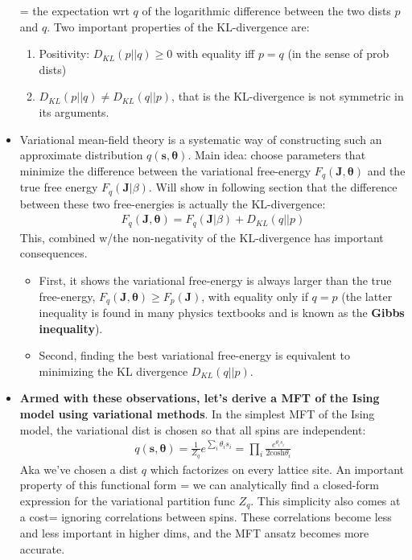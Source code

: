 \documentclass[norsk,a4paper,11pt]{article}
\begin{document}
\begin{itemize}
	= the expectation wrt $q$ of the logarithmic difference between the two dists $p$ and $q$. Two important properties of the KL-divergence are:
	\begin{enumerate}
		\item Positivity: $D_{KL}(p||q) \geq 0 $ with equality iff $p=q$ (in the sense of prob dists)
		\item $D_{KL}(p||q) \neq D_{KL}(q||p)$, that is the KL-divergence is not symmetric in its arguments.
	\end{enumerate}
	\item Variational mean-field theory is a systematic way of constructing such an approximate distribution $q(\bm{s}, \bm{\theta})$. Main idea: choose parameters that minimize the difference between the variational free-energy $F_q(\bm{J}, \bm{\theta})$ and the true free energy $F_q(\bm{J}|\beta)$. Will show in following section that the difference between these two free-energies is actually the KL-divergence:
	\begin{align}
		F_q(\bm{J}, \bm{\theta}) = F_q(\bm{J}|\beta) + D_{KL}(q||p) 
	\end{align}
	This, combined w/the non-negativity of the KL-divergence has important consequences.
	\begin{itemize}
		\item First, it shows the variational free-energy is always larger than the true free-energy, $F_q(\bm{J}, \bm{\theta}) \geq F_p(\bm{J})$, with equality only if $q=p$ (the latter inequality is found in many physics textbooks and is known as the \textbf{Gibbs inequality}).
		\item Second, finding the best variational free-energy is equivalent to minimizing the KL divergence $D_{KL}(q||p)$.  
	\end{itemize} 
	\item \textbf{Armed with these observations, let's derive a MFT of the Ising model using variational methods}. In the simplest MFT of the Ising model, the variational dist is chosen so that all spins are independent:
	\begin{align}
		q(\bm{s}, \bm{\theta}) = \frac{1}{Z_q} e^{\sum_i \theta_i s_i} = \prod_i \frac{e^{\theta_i s_i}}{2\text{cosh} \theta_i}
	\end{align}
	Aka we've chosen a dist $q$ which factorizes on every lattice site. An important property of this functional form = we can analytically find a closed-form expression for the variational partition func $Z_q$. This simplicity also comes at a cost= ignoring correlations between spins. These correlations become less and less important in higher dims, and the MFT ansatz becomes more accurate.

\end{itemize}
\end{document}
